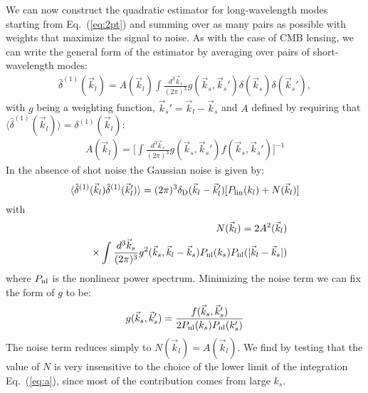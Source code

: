 \documentclass[prd,amsmath,amssymb,floatfix,superscriptaddress,nofootinbib,twocolumn]{revtex4-1}
\def\be{\begin{equation}}
\def\ee{\end{equation}}
\newcommand{\vs}{\nonumber\\}
\newcommand{\vk}{\vec{k}}
\newcommand{\ec}[1]{Eq.~(\ref{eq:#1})}
\newcommand{\eql}[1]{\label{eq:#1}}
\begin{document}
\label{sec2}
We can now construct the quadratic estimator for long-wavelength modes starting from \ec{2pt} and summing over as many pairs as possible with weights that maximize the signal to noise. As with the case of CMB lensing, we can write the general form of the estimator by averaging over pairs of short-wavelength modes:
\begin{eqnarray}
\hat{\delta}^{(1)}(\vec{k}_l)=A(\vec{k}_l)\int \frac{d^3 \vec{k}_s}{(2\pi)^3} g(\vec{k}_s,\vec{k}_s'){\delta}(\vec{k}_s){\delta}(\vec{k}_s') \eql{quadest},
\end{eqnarray} 
with $g$ being a weighting function, $\vk_s'=\vk_l-\vk_s$ and $A$  defined by requiring that $\langle \hat{\delta}^{(1)}(\vec{k}_l) \rangle={\delta}^{(1)}(\vec{k}_l)$:
\begin{eqnarray}
A(\vec{k}_l)=\bigg[\int \frac{d^3 \vec{k}_s}{(2\pi)^3} g(\vec{k}_s,\vec{k}_s')f(\vec{k}_s,\vec{k}_s')  \bigg]^{-1} \eql{a}
\end{eqnarray}
In the absence of shot noise the Gaussian noise is given by:
\be 
\langle \hat{\delta}^{(1)}(\vk_{l})\hat{\delta}^{(1)}(\vk_{l}') \rangle = (2\pi)^3 \delta_{\rm D}(\vk_{l}-\vk_{l}')[P_{\rm lin}(k_{l})+N(\vk_l)]
\ee 
with 
\begin{eqnarray}
&&N(\vec{k}_{l})=2A^2(\vk_{l})\vs
&&\times\int \frac{d^3 \vec{k}_{s}}{(2\pi)^3} g^2(\vec{k}_{s},\vk_l-\vec{k}_{s})P_{\rm nl}(k_{s})P_{\rm nl}(|\vk_l-\vk_s|)
\end{eqnarray}
where $P_{\rm nl}$ is the nonlinear power spectrum. Minimizing the noise term we can fix the form of $g$ to be:
\begin{eqnarray}
g(\vec{k}_{s},\vec{k}_{s}')=\frac{f(\vec{k}_{s},\vec{k}_{s}')}{2P_{\rm nl}(k_{s})P_{\rm nl}(k_{s}')}
\end{eqnarray} 
The noise term reduces simply to $N(\vk_l)=A(\vk_l)$. We find by testing that the value of $N$ is very insensitive to the choice of the lower limit of the integration \ec{a}, since most of the contribution comes from large $k_s$. %
\end{document}

